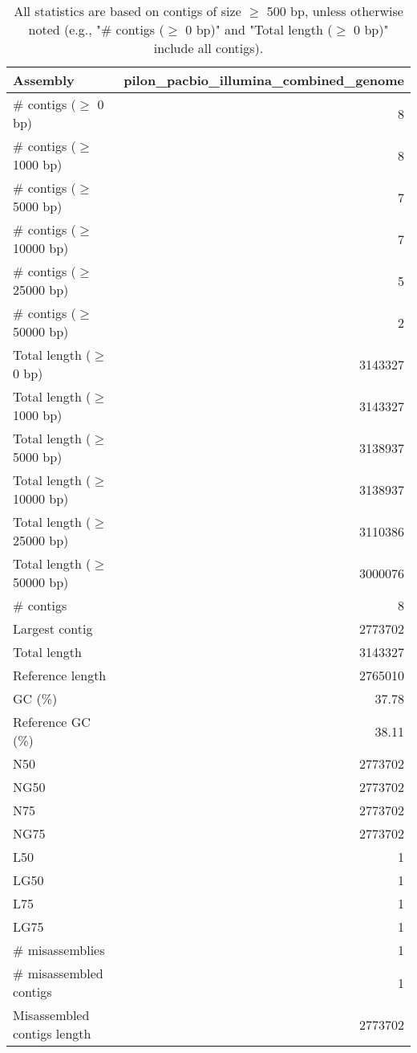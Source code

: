 \documentclass[12pt,a4paper]{article}
\begin{document}
\begin{table}[ht]
\begin{center}
\caption{All statistics are based on contigs of size $\geq$ 500 bp, unless otherwise noted (e.g., "\# contigs ($\geq$ 0 bp)" and "Total length ($\geq$ 0 bp)" include all contigs).}
\begin{tabular}{|l*{1}{|r}|}
\hline
Assembly & pilon\_pacbio\_illumina\_combined\_genome \\ \hline
\# contigs ($\geq$ 0 bp) & 8 \\ \hline
\# contigs ($\geq$ 1000 bp) & 8 \\ \hline
\# contigs ($\geq$ 5000 bp) & 7 \\ \hline
\# contigs ($\geq$ 10000 bp) & 7 \\ \hline
\# contigs ($\geq$ 25000 bp) & 5 \\ \hline
\# contigs ($\geq$ 50000 bp) & 2 \\ \hline
Total length ($\geq$ 0 bp) & 3143327 \\ \hline
Total length ($\geq$ 1000 bp) & 3143327 \\ \hline
Total length ($\geq$ 5000 bp) & 3138937 \\ \hline
Total length ($\geq$ 10000 bp) & 3138937 \\ \hline
Total length ($\geq$ 25000 bp) & 3110386 \\ \hline
Total length ($\geq$ 50000 bp) & 3000076 \\ \hline
\# contigs & 8 \\ \hline
Largest contig & 2773702 \\ \hline
Total length & 3143327 \\ \hline
Reference length & 2765010 \\ \hline
GC (\%) & 37.78 \\ \hline
Reference GC (\%) & 38.11 \\ \hline
N50 & 2773702 \\ \hline
NG50 & 2773702 \\ \hline
N75 & 2773702 \\ \hline
NG75 & 2773702 \\ \hline
L50 & 1 \\ \hline
LG50 & 1 \\ \hline
L75 & 1 \\ \hline
LG75 & 1 \\ \hline
\# misassemblies & 1 \\ \hline
\# misassembled contigs & 1 \\ \hline
Misassembled contigs length & 2773702 \\ \hline

\end{tabular}
\end{center}
\end{table}
\end{document}
